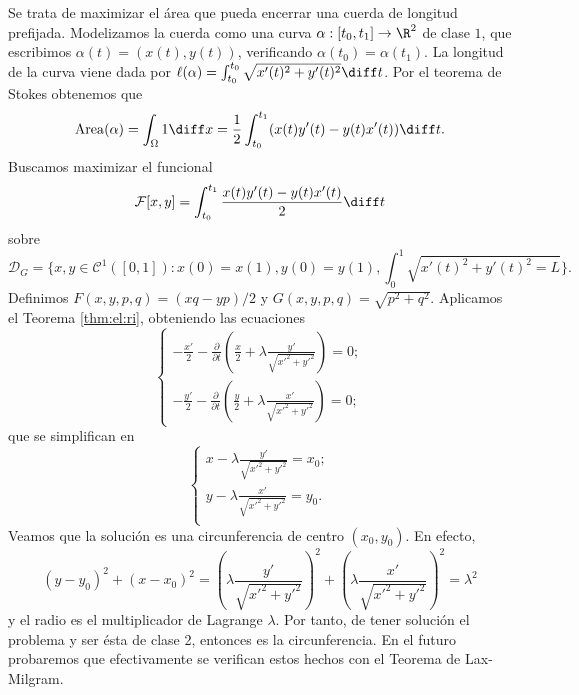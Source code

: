 \documentclass{article}
\begin{document}
\begin{ex}
  Se trata de maximizar el área que pueda encerrar una cuerda de longitud prefijada. Modelizamos la
  cuerda como una curva $\alpha: [t_0, t_1] \to \R^2$ de clase $1$, que escribimos
  $\alpha(t) = (x(t), y(t))$, verificando $\alpha(t_0) = \alpha(t_1)$. La longitud de la curva viene
  dada por $\ell(\alpha) = \int_{t_0}^{t_0} \sqrt{x'(t)^2 + y'(t)^2} \diff t$. Por el teorema de
  Stokes obtenemos que
  \[\mathrm{Area}(\alpha) = \int_\Omega 1 \diff x = \frac{1}{2} \int_{t_0}^{t_1}(x(t) y'(t) -
    y(t)x'(t))\diff t.\] Buscamos maximizar el funcional
  \[\mathcal{F}[x, y] = \int_{t_0}^{t_1} \frac{x(t) y'(t) - y(t)x'(t)}{2} \diff t\]
  sobre
  \[\mathcal{D}_G = \{x, y \in \mathcal{C}^1([0,1]): x(0) = x(1), y(0) = y(1), \int_0^1
    \sqrt{x'(t)^2 + y'(t) ^2 = L}\}.\] Definimos $F(x,y,p,q) = (xq-yp)/2$ y
  $G(x,y,p,q) = \sqrt{p^2 + q^2}$. Aplicamos el Teorema \ref{thm:el:ri}, obteniendo las ecuaciones
  \begin{equation*}
    \label{eq:1}
    \begin{cases}
      -\frac{x'}{2} - \frac{\partial}{\partial t} \left(\frac{x}{2} + \lambda \frac{y'}{\sqrt{x'^2 + y'^2}}\right) = 0; \\
      -\frac{y'}{2} - \frac{\partial}{\partial t} \left(\frac{y}{2} + \lambda \frac{x'}{\sqrt{x'^2 +
            y'^2}}\right) = 0;
    \end{cases}
  \end{equation*}
  que se simplifican en
  \begin{equation*}
    \label{eq:1}
    \begin{cases}
      x - \lambda \frac{y'}{\sqrt{x'^2 + y'^2}} = x_0; \\
      y - \lambda \frac{x'}{\sqrt{x'^2 + y'^2}} = y_0. \\
    \end{cases}
  \end{equation*}
  Veamos que la solución es una circunferencia de centro $(x_0, y_0)$. En efecto,
  \[(y-y_0)^2 + (x-x_0)^2 = \left(\lambda \frac{y'}{\sqrt{x'^2 + y'^2}}\right)^2 + \left(\lambda
      \frac{x'}{\sqrt{x'^2 + y'^2}}\right)^2 = \lambda^2\] y el radio es el multiplicador de
  Lagrange $\lambda$. Por tanto, de tener solución el problema y ser ésta de clase 2, entonces es la
  circunferencia. En el futuro probaremos que efectivamente se verifican estos hechos con el Teorema
  de Lax-Milgram.
\end{ex}
\end{document}
